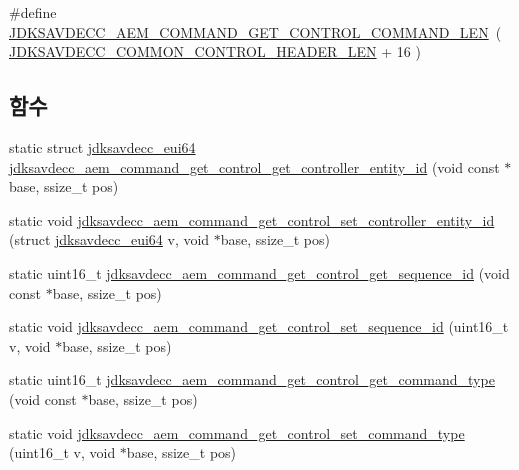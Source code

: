 \begin{DoxyCompactItemize}
\item 
\#define \hyperlink{group__command__get__control_ga1c638c26d2d71578b725bf24ae975d98}{J\+D\+K\+S\+A\+V\+D\+E\+C\+C\+\_\+\+A\+E\+M\+\_\+\+C\+O\+M\+M\+A\+N\+D\+\_\+\+G\+E\+T\+\_\+\+C\+O\+N\+T\+R\+O\+L\+\_\+\+C\+O\+M\+M\+A\+N\+D\+\_\+\+L\+EN}~( \hyperlink{group__jdksavdecc__avtp__common__control__header_gaae84052886fb1bb42f3bc5f85b741dff}{J\+D\+K\+S\+A\+V\+D\+E\+C\+C\+\_\+\+C\+O\+M\+M\+O\+N\+\_\+\+C\+O\+N\+T\+R\+O\+L\+\_\+\+H\+E\+A\+D\+E\+R\+\_\+\+L\+EN} + 16 )
\end{DoxyCompactItemize}
\subsection*{함수}
\begin{DoxyCompactItemize}
\item 
static struct \hyperlink{structjdksavdecc__eui64}{jdksavdecc\+\_\+eui64} \hyperlink{group__command__get__control_gac352b634515e5bec5342e405dee7d692}{jdksavdecc\+\_\+aem\+\_\+command\+\_\+get\+\_\+control\+\_\+get\+\_\+controller\+\_\+entity\+\_\+id} (void const $\ast$base, ssize\+\_\+t pos)
\item 
static void \hyperlink{group__command__get__control_ga8b4c64292e527eefd69b8cfe06cbd288}{jdksavdecc\+\_\+aem\+\_\+command\+\_\+get\+\_\+control\+\_\+set\+\_\+controller\+\_\+entity\+\_\+id} (struct \hyperlink{structjdksavdecc__eui64}{jdksavdecc\+\_\+eui64} v, void $\ast$base, ssize\+\_\+t pos)
\item 
static uint16\+\_\+t \hyperlink{group__command__get__control_ga83948f9246e8a60fe845c9b78f998c7c}{jdksavdecc\+\_\+aem\+\_\+command\+\_\+get\+\_\+control\+\_\+get\+\_\+sequence\+\_\+id} (void const $\ast$base, ssize\+\_\+t pos)
\item 
static void \hyperlink{group__command__get__control_ga5bb004488529b5aeb6abeeb99a2794bd}{jdksavdecc\+\_\+aem\+\_\+command\+\_\+get\+\_\+control\+\_\+set\+\_\+sequence\+\_\+id} (uint16\+\_\+t v, void $\ast$base, ssize\+\_\+t pos)
\item 
static uint16\+\_\+t \hyperlink{group__command__get__control_gace8b9febeaa383fdcbde59aef4426496}{jdksavdecc\+\_\+aem\+\_\+command\+\_\+get\+\_\+control\+\_\+get\+\_\+command\+\_\+type} (void const $\ast$base, ssize\+\_\+t pos)
\item 
static void \hyperlink{group__command__get__control_ga151ea50fe16e5a074fb9e26437b838f2}{jdksavdecc\+\_\+aem\+\_\+command\+\_\+get\+\_\+control\+\_\+set\+\_\+command\+\_\+type} (uint16\+\_\+t v, void $\ast$base, ssize\+\_\+t pos)
\item 

\end{DoxyCompactItemize}
